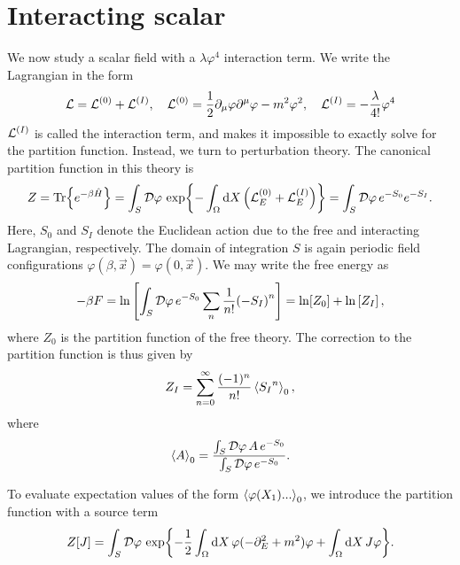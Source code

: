 \section{Interacting scalar}
\label{section:interacting scalar}

We now study a scalar field with a $\lambda \varphi^4$ interaction term.
We write the Lagrangian in the form
\begin{equation*}
    \mathcal{L} = \mathcal{L}^{(0)} + \mathcal{L}^{(I)}, \quad 
    \mathcal{L}^{(0)} = 
    \frac{1}{2} \partial_\mu \varphi \partial^\mu \varphi - m^2 \varphi^2 , \quad
    \mathcal{L}^{(I)} = - \frac{\lambda}{4!} \varphi^4
\end{equation*}
$\mathcal{L}^{(I)}$ is called the interaction term, and makes it impossible to exactly solve for the partition function.
Instead, we turn to perturbation theory.
The canonical partition function in this theory is
\begin{equation}
    Z = \Tr{e^{- \beta \hat H}}
    = \int_S \mathcal{D} \varphi \, \exp{
        - \int_\Omega \dd X \left(\mathcal{L}_E^{(0)} + \mathcal{L}_E^{(I)}\right)
    }
    = \int_S \mathcal{D} \varphi \, e^{-S_0} e^{-S_I}.
\end{equation}
Here, $S_0$ and $S_I$ denote the Euclidean action due to the free and interacting Lagrangian, respectively.
The domain of integration $S$ is again periodic field configurations $\varphi(\beta, \vec x) = \varphi(0, \vec x)$.
We may write the free energy as
\begin{equation*}
    - \beta F = \ln
    \left[
        \int_S \mathcal{D} \varphi \, e^{-S_0} \sum_n \frac{1}{n!} {(-S_I)}^n
    \right]
    = \ln[Z_0] 
    + \ln
    \left[
        Z_I
    \right],
\end{equation*}
where $Z_0$ is the partition function of the free theory.
The correction to the partition function is thus given by
\begin{equation}
    Z_I = \sum_{n=0}^\infty \frac{(-1)^n}{n!} \ex{{S_I}^n}_0,
\end{equation}
where
\begin{equation}
    \ex{A}_0 = \frac{
        \int_S \D \varphi \, A \, e^{-S_0} }
    {\int_S \D \varphi \, e^{-S_0}}.
\end{equation}

To evaluate expectation values of the form $\ex{\varphi(X_1) ... }_0$, we introduce the partition function with a source term
\begin{align}
    Z[J] = \int_S \mathcal{D} \varphi \, \exp{
        - \frac{1}{2} \int_\Omega \dd X \, \varphi (-\partial_E^2 + m^2) \varphi
        + \int_\Omega \dd X \, J \varphi
    }.
\end{align}

